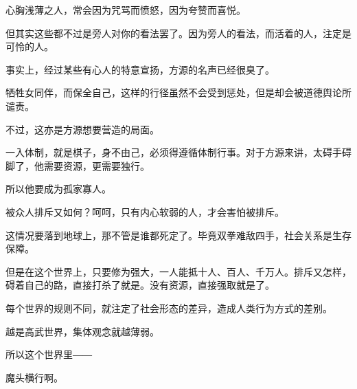 \begin{this_body}
心胸浅薄之人，常会因为咒骂而愤怒，因为夸赞而喜悦。

但其实这些都不过是旁人对你的看法罢了。因为旁人的看法，而活着的人，注定是可怜的人。

事实上，经过某些有心人的特意宣扬，方源的名声已经很臭了。

牺牲女同伴，而保全自己，这样的行径虽然不会受到惩处，但是却会被道德舆论所谴责。

不过，这亦是方源想要营造的局面。

一入体制，就是棋子，身不由己，必须得遵循体制行事。对于方源来讲，太碍手碍脚了，他需要资源，更需要独行。

所以他要成为孤家寡人。

被众人排斥又如何？呵呵，只有内心软弱的人，才会害怕被排斥。

这情况要落到地球上，那不管是谁都死定了。毕竟双拳难敌四手，社会关系是生存保障。

但是在这个世界上，只要修为强大，一人能抵十人、百人、千万人。排斥又怎样，碍着自己的路，直接打杀了就是。没有资源，直接强取就是了。

每个世界的规则不同，就注定了社会形态的差异，造成人类行为方式的差别。

越是高武世界，集体观念就越薄弱。

所以这个世界里――

魔头横行啊。

\end{this_body}

